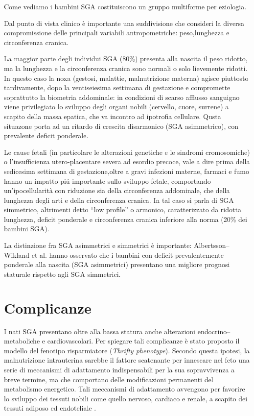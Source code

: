 Come vediamo i bambini SGA costituiscono un gruppo multiforme per eziologia.

Dal punto di vista clinico è importante una suddivisione che consideri la diversa compromissione delle principali variabili antropometriche: peso,lunghezza e circonferenza cranica.

La maggior parte degli individui SGA (80\%) presenta alla nascita il peso ridotto, ma la lunghezza e la circonferenza cranica sono normali o solo lievemente ridotti.
In questo caso la noxa (gestosi, malattie, malnutrizione materna) agisce piuttosto tardivamente, dopo la ventiseiesima settimana di gestazione e compromette soprattutto la biometria addominale: in condizioni di scarso afflusso sanguigno viene privilegiato lo sviluppo degli organi nobili (cervello, cuore, surrene) a scapito della massa epatica, che va incontro ad ipotrofia cellulare. 
Qusta situazone porta ad un ritardo di crescita disarmonico (SGA asimmetrico), con prevalente deficit ponderale.

Le cause fetali (in particolare le alterazioni genetiche e le sindromi cromosomiche) o l'insufficienza utero-placentare severa ad esordio 
precoce, vale a dire prima della sedicesima settimana di gestazione,oltre a gravi infezioni materne, farmaci e fumo  hanno un impatto pi\'u importante sullo sviluppo fetale, comportando un'ipocellularità con riduzione sia della circonferenza addominale, che della lunghezza degli arti e della circonferenza cranica. In tal caso si parla di SGA simmetrico, altrimenti detto "`low profile"' o armonico, caratterizzato da ridotta lunghezza, deficit ponderale e circonferenza cranica inferiore alla norma (20\% dei bambini SGA).

La distinzione fra SGA asimmetrici e simmetrici \`e importante: Albertsson--Wikland et al. hanno osservato che i bambini con deficit prevalentemente ponderale alla nascita 
(SGA asimmetrici) presentano una migliore prognosi staturale rispetto agli SGA simmetrici.\cite{sga-10}

\clearpage

\section{Complicanze}

I nati SGA presentano oltre alla bassa statura anche alterazioni endocrino--metaboliche e cardiovascolari. 
Per spiegare tali complicanze è stato proposto il modello del fenotipo risparmiatore (\textit{Thrifty phenotype}).
Secondo questa ipotesi, la malnutrizione intrauterina sarebbe il fattore scatenante
per innescare nel feto una serie di meccanismi di adattamento indispensabili per 
la sua sopravvivenza a breve termine, ma che comportano delle modificazioni permanenti
del metabolismo energetico.
Tali meccanismi di adattamento avvengono per favorire lo sviluppo dei tessuti 
nobili come quello nervoso, cardiaco e renale, a scapito dei tessuti adiposo ed endoteliale .

